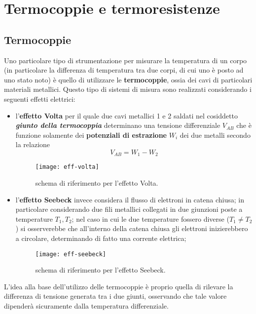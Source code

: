 \chapter{Termocoppie e termoresistenze}
\section{Termocoppie}
	
	Uno particolare tipo di strumentazione per misurare la temperatura di un corpo (in particolare la differenza di temperatura tra due corpi, di cui uno è posto ad uno stato noto) è quello di utilizzare le \textbf{termocoppie}, ossia dei cavi di particolari materiali metallici. Questo tipo di sistemi di misura sono realizzati considerando i seguenti effetti elettrici:
	\begin{itemize}
		\item l'\textbf{effetto Volta} per il quale due cavi metallici 1 e 2 saldati nel cosiddetto \textbf{\textit{giunto della termocoppia}} determinano una tensione differenziale $V_{AB}$ che è funzione solamente dei \textbf{potenziali di estrazione} $W_i$ dei due metalli secondo la relazione
		\begin{equation}
			V_{AB} = W_1-W_2
		\end{equation}
		
		\begin{SCfigure}[1][bht]
			\centering
			\texttt{[image: eff-volta]}
			\caption{schema di riferimento per l'effetto Volta.}
		\end{SCfigure}
		
		\item l'\textbf{effetto Seebeck} invece considera il flusso di elettroni in catena chiusa; in particolare considerando due fili metallici collegati in due giunzioni poste a temperature $T_1,T_2$; nel caso in cui le due temperature fossero diverse ($T_1\neq T_2$) si osserverebbe che all'interno della catena chiusa gli elettroni inizierebbero a circolare, determinando di fatto una corrente elettrica;
	
		\begin{SCfigure}[1][bht]
			\centering
			\texttt{[image: eff-seebeck]}
			\caption{schema di riferimento per l'effetto Seebeck.}
		\end{SCfigure}
	\end{itemize}

	L'idea alla base dell'utilizzo delle termocoppie è proprio quella di rilevare la differenza di tensione generata tra i due giunti, osservando che tale valore dipenderà sicuramente dalla temperatura differenziale.

